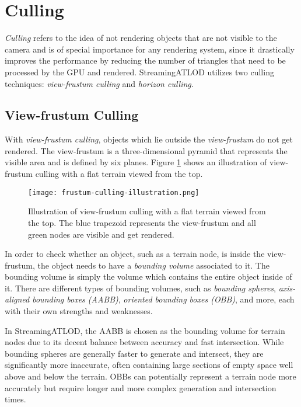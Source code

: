 \section{Culling}
\textit{Culling} refers to the idea of not rendering 
objects that are not visible to the camera and is of special importance
for any rendering system, since it drastically improves the performance 
by reducing the number of triangles that need to be processed by the GPU and rendered.
StreamingATLOD utilizes two culling techniques: \textit{view-frustum culling} and \textit{horizon culling}.

\subsection{View-frustum Culling}
With \textit{view-frustum culling},
objects which lie outside the \textit{view-frustum} do 
not get rendered.
The view-frustum is a three-dimensional pyramid that represents the visible area and is defined by six planes.
Figure \ref{fig:view-frustum-illustration} shows an illustration 
of view-frustum culling with a flat terrain viewed from the top.

\begin{figure}[H]
  \centering
  \texttt{[image: frustum-culling-illustration.png]}
  \caption{Illustration of view-frustum culling with a 
  flat terrain viewed from the top. The blue trapezoid represents 
  the view-frustum and all green nodes are visible and get rendered.}\label{fig:view-frustum-illustration}
\end{figure}

In order to check whether an object, such as a terrain node, is inside the view-frustum, the object 
needs to have a \textit{bounding volume} associated to it.
The bounding volume is simply the volume which contains the entire object inside of it.
There are different types of bounding volumes,
such as \textit{bounding spheres}, \textit{axis-aligned bounding boxes (AABB)}, \textit{oriented bounding boxes (OBB)}, and more,
each with their own strengths and weaknesses. 

In StreamingATLOD, the AABB is chosen as the bounding volume for terrain nodes 
due to its decent balance between accuracy and fast intersection.
While bounding spheres are generally faster to generate and intersect,
they are significantly more inaccurate, often containing large sections of empty space
well above and below the terrain.
OBBs can potentially represent a terrain node more accurately but 
require longer and more complex generation and intersection times.


